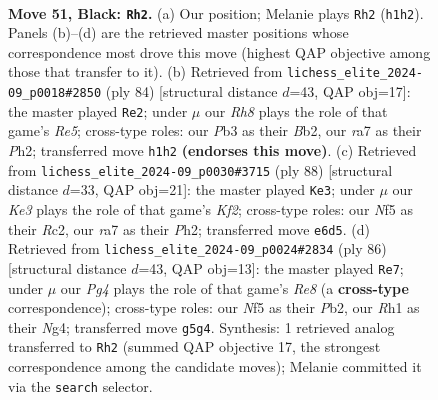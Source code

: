 \documentclass[11pt]{article}
\begin{document}
\clearpage

\begin{figure}[p]\centering
\begin{subfigure}{0.46\textwidth}\centering
\resizebox{\linewidth}{!}{%
\newchessgame
\chessboard[
  setfen={6r1/R7/3pk3/5npp/8/1p3K2/1R2N1P1/7r b - - 1 51},
  showmover=false,
  pgfstyle=straightmove, color=movearrow, markmove={h1-h2}
]}
\caption{}
\end{subfigure}\hfill
\begin{subfigure}{0.46\textwidth}\centering
\resizebox{\linewidth}{!}{%
\newchessgame
\chessboard[
  setfen={5r2/3k2pp/1r1n4/p2PR3/6P1/P2R4/KB5P/8 w - - 3 43},
  showmover=false,
  pgfstyle=straightmove, color=movearrow, markmove={e5-e2}
]}
\caption{}
\end{subfigure}
\\[4pt]
\begin{subfigure}{0.46\textwidth}\centering
\resizebox{\linewidth}{!}{%
\newchessgame
\chessboard[
  setfen={r3n3/P2k3p/6p1/1N2p3/4P3/5P2/2R2KPP/8 w - - 3 45},
  showmover=false,
  pgfstyle=straightmove, color=movearrow, markmove={f2-e3}
]}
\caption{}
\end{subfigure}\hfill
\begin{subfigure}{0.46\textwidth}\centering
\resizebox{\linewidth}{!}{%
\newchessgame
\chessboard[
  setfen={4R3/2kn4/8/p7/6N1/PP1r4/KP6/8 w - - 10 44},
  showmover=false,
  pgfstyle=straightmove, color=movearrow, markmove={e8-e7}
]}
\caption{}
\end{subfigure}
\caption{\textbf{Move 51, Black: \texttt{Rh2}.} (a) Our position; Melanie plays \texttt{Rh2} (\texttt{h1h2}). Panels (b)--(d) are the retrieved master positions whose correspondence most drove this move (highest QAP objective among those that transfer to it). (b) Retrieved from \texttt{lichess\_elite\_2024-09\_p0018\#2850} (ply 84) [structural distance $d$=43, QAP obj=17]: the master played \texttt{Re2}; under $\mu$ our \emph{Rh8} plays the role of that game's \emph{Re5}; cross-type roles: our \emph{P}b3 as their \emph{B}b2, our \emph{r}a7 as their \emph{P}h2; transferred move \texttt{h1h2} \textbf{(endorses this move)}. (c) Retrieved from \texttt{lichess\_elite\_2024-09\_p0030\#3715} (ply 88) [structural distance $d$=33, QAP obj=21]: the master played \texttt{Ke3}; under $\mu$ our \emph{Ke3} plays the role of that game's \emph{Kf2}; cross-type roles: our \emph{N}f5 as their \emph{R}c2, our \emph{r}a7 as their \emph{P}h2; transferred move \texttt{e6d5}. (d) Retrieved from \texttt{lichess\_elite\_2024-09\_p0024\#2834} (ply 86) [structural distance $d$=43, QAP obj=13]: the master played \texttt{Re7}; under $\mu$ our \emph{Pg4} plays the role of that game's \emph{Re8} (a \textbf{cross-type} correspondence); cross-type roles: our \emph{N}f5 as their \emph{P}b2, our \emph{R}h1 as their \emph{N}g4; transferred move \texttt{g5g4}. Synthesis: 1 retrieved analog transferred to \texttt{Rh2} (summed QAP objective 17, the strongest correspondence among the candidate moves); Melanie committed it via the \texttt{search} selector.}
\label{fig:thought-m101}
\end{figure}
\end{document}
